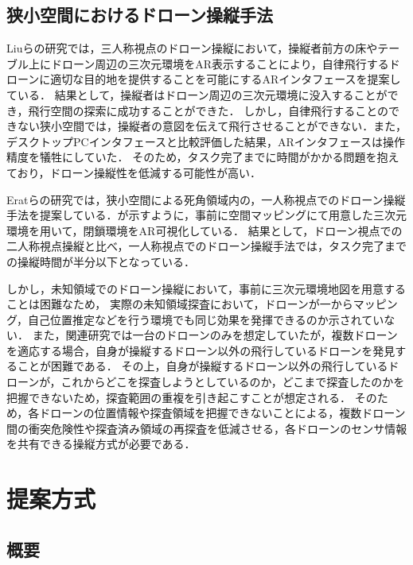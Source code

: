 \documentclass[a4paper,11pt]{ujreport}
\begin{document}
\section{狭小空間におけるドローン操縦手法}
\label{sec:NarrowSpace}

Liuらの研究\cite{book-ar04}では，三人称視点のドローン操縦において，操縦者前方の床やテーブル上にドローン周辺の三次元環境をAR表示することにより，自律飛行するドローンに適切な目的地を提供することを可能にするARインタフェースを提案している．
結果として，操縦者はドローン周辺の三次元環境に没入することができ，飛行空間の探索に成功することができた．
しかし，自律飛行することのできない狭小空間では，操縦者の意図を伝えて飛行させることができない．また，デスクトップPCインタフェースと比較評価した結果，ARインタフェースは操作精度を犠牲にしていた．
そのため，タスク完了までに時間がかかる問題を抱えており，ドローン操縦性を低減する可能性が高い．

Eratらの研究\cite{article-ar05}では，狭小空間による死角領域内の，一人称視点でのドローン操縦手法を提案している．が示すように，事前に空間マッピングにて用意した三次元環境を用いて，閉鎖環境をAR可視化している．
結果として，ドローン視点での二人称視点操縦と比べ，一人称視点でのドローン操縦手法では，タスク完了までの操縦時間が半分以下となっている．

しかし，未知領域でのドローン操縦において，事前に三次元環境地図を用意することは困難なため，
実際の未知領域探査において，ドローンが一からマッピング，自己位置推定などを行う環境でも同じ効果を発揮できるのか示されていない．
また，関連研究では一台のドローンのみを想定していたが，複数ドローンを適応する場合，自身が操縦するドローン以外の飛行しているドローンを発見することが困難である．
その上，自身が操縦するドローン以外の飛行しているドローンが，これからどこを探査しようとしているのか，どこまで探査したのかを把握できないため，探査範囲の重複を引き起こすことが想定される．
そのため，各ドローンの位置情報や探査領域を把握できないことによる，複数ドローン間の衝突危険性や探査済み領域の再探査を低減させる，各ドローンのセンサ情報を共有できる操縦方式が必要である．


\chapter{提案方式}
\label{chap:ProposedMethod}

\section{概要}
\label{sec:ProposedOutline}
\end{document}
